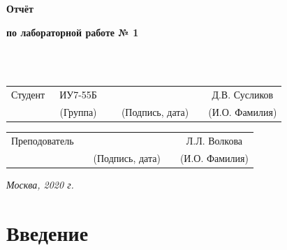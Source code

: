 \documentclass[12pt]{report}
\begin{document}
	
	\begin{center}
		\vspace{3cm}
		{\bf\huge Отчёт\par}
		{\bf\Large по лабораторной работе № 1\par}
		\vspace{0.5cm}
	\end{center}
	
	
	\noindent
	\\
	
	\noindent
	\\
	
	\vspace{1.5cm}
	\noindent
	\begin{tabular}{l c c c c c}
		Студент      & ~ИУ7-55Б~               & \hspace{3.5cm} & \hspace{3.5cm}                 & &  Д.В. Сусликов \\\cline{2-2}\cline{4-4} \cline{6-6} 
		\hspace{3cm} & {\footnotesize(Группа)} &                & {\footnotesize(Подпись, дата)} & & {\footnotesize(И.О. Фамилия)}
	\end{tabular}
	
	\vspace{1cm}
	
	\noindent
	\begin{tabular}{l c c c c}
		Преподователь & \hspace{6cm}   & \hspace{3.5cm}                 & & Л.Л. Волкова \\\cline{3-3} \cline{5-5} 
		\hspace{3cm}  &                & {\footnotesize(Подпись, дата)} & & {\footnotesize(И.О. Фамилия)}
	\end{tabular}
	
	\begin{center}	
		\vfill
		\large \textit {Москва, 2020 г.}
	\end{center}
	
	\thispagestyle {empty}
	\pagebreak
	
	\tableofcontents
	\onehalfspacing
	
	\newpage
	\chapter*{Введение}
	
\end{document}

